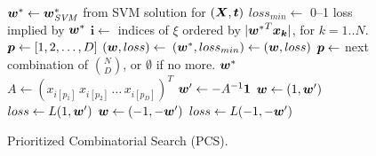 \begin{figure}[tp!]
\vspace{-3mm}
\caption{
Prioritized Combinatorial Search (PCS).\hfill\; \\
}
\label{alg:cs.prioritized}
{\footnotesize 
\begin{algorithmic}[1]
 
\State $\boldsymbol{w}^* \gets \boldsymbol{w}^*_{\mathit{SVM}}$ from SVM solution for $(\boldsymbol{X},\boldsymbol{t})$
\State $loss_{min} \gets$ 0--1 loss implied by $\boldsymbol{w}^*$
\State $\boldsymbol{i} \gets$ indices of $\xi$ ordered by $|{\boldsymbol{w}^*}^T\boldsymbol{x_k}|$, for $k=1..N$.
\State $\boldsymbol{p} \gets [1,2,\dots,D]$
\While{$\p \not= \emptyset$}
   \State $(\boldsymbol{w},loss) \gets$ 
      \State $(\boldsymbol{w}^*, loss_{min}) \gets (\boldsymbol{w}, loss)$
   \EndIf
   \State $\boldsymbol{p} \gets $ next combination of ${N \choose D}$, or $\emptyset$ if no more.
\EndWhile
\State \Return $\boldsymbol{w}^*$
\Statex
{} 
   \State $A \gets (x_{i[p_1]} \, x_{i[p_2]} \, \dots \, x_{i[p_D]})^T$
   \State $\boldsymbol{w}' \gets -A^{-1} \boldsymbol{1}$
      \State $\boldsymbol{w} \gets (1, \boldsymbol{w}')$
      \State $loss \gets L(1,\boldsymbol{w}')$
   \Else
      \State $\boldsymbol{w} \gets (-1, -\boldsymbol{w}')$
      \State $loss \gets L(-1,-\boldsymbol{w}')$
   \EndIf
   \State {} 
\EndFunction
\Statex
\EndFunction
\end{algorithmic}}
\vspace{-4mm}
\end{figure}

\COMMENT

